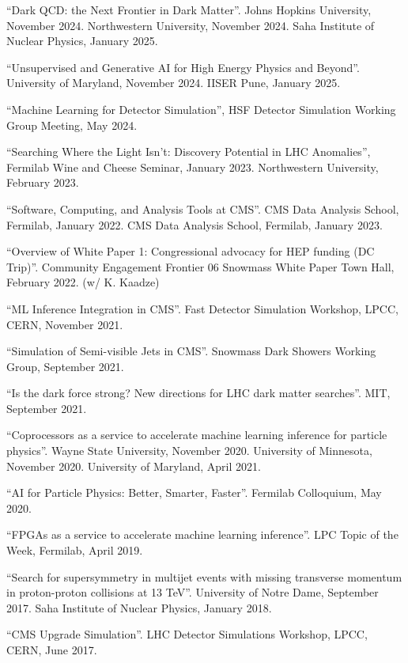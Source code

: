 \begin{description}[leftmargin=12pt,font=\normalfont,labelsep=0em]
\item ``Dark QCD: the Next Frontier in Dark Matter''. Johns Hopkins University, November 2024. Northwestern University, November 2024. Saha Institute of Nuclear Physics, January 2025.
\item ``Unsupervised and Generative AI for High Energy Physics and Beyond''. University of Maryland, November 2024. IISER Pune, January 2025.
\item ``Machine Learning for Detector Simulation'', HSF Detector Simulation Working Group Meeting, May 2024.
\item ``Searching Where the Light Isn't: Discovery Potential in LHC Anomalies'', Fermilab Wine and Cheese Seminar, January 2023. Northwestern University, February 2023.
\item ``Software, Computing, and Analysis Tools at CMS''. CMS Data Analysis School, Fermilab, January 2022. CMS Data Analysis School, Fermilab, January 2023.
\item ``Overview of White Paper 1: Congressional advocacy for HEP funding (DC Trip)''. Community Engagement Frontier 06 Snowmass White Paper Town Hall, February 2022. (w/ K. Kaadze)
\item ``ML Inference Integration in CMS''. Fast Detector Simulation Workshop, LPCC, CERN, November 2021.
\item ``Simulation of Semi-visible Jets in CMS''. Snowmass Dark Showers Working Group, September 2021.
\item ``Is the dark force strong? New directions for LHC dark matter searches''. MIT, September 2021.
\item ``Coprocessors as a service to accelerate machine learning inference for particle physics''. Wayne State University, November 2020. University of Minnesota, November 2020. University of Maryland, April 2021.
\item ``AI for Particle Physics: Better, Smarter, Faster''. Fermilab Colloquium, May 2020.
\item ``FPGAs as a service to accelerate machine learning inference''. LPC Topic of the Week, Fermilab, April 2019.
\item ``Search for supersymmetry in multijet events with missing transverse momentum in proton-proton collisions at 13 TeV''. University of Notre Dame, September 2017. Saha Institute of Nuclear Physics, January 2018.
\item ``CMS Upgrade Simulation''. LHC Detector Simulations Workshop, LPCC, CERN, June 2017.

\end{description}
